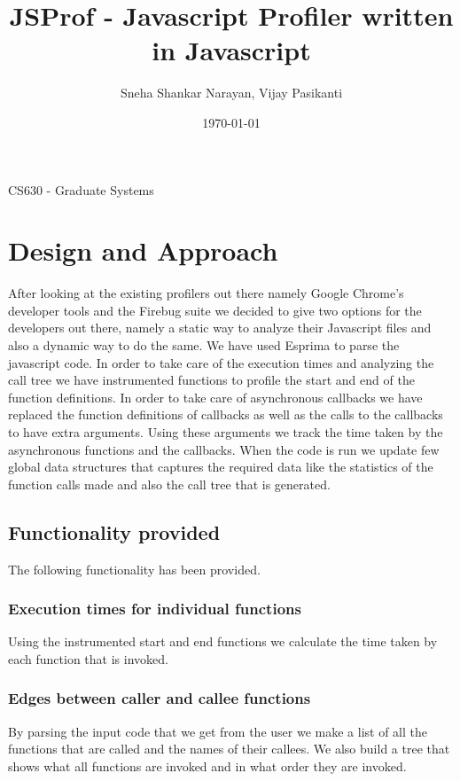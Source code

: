 \documentclass[a4paper, 12pt, notitlepage]{report}
\title{JSProf - Javascript Profiler written in Javascript } %
\author{Sneha Shankar Narayan, Vijay Pasikanti} %
\date{\today} %
\begin{document}
\maketitle
\begin{center}
CS630 - Graduate Systems
\end{center}
\thispagestyle{empty}
\newpage

\tableofcontents 


\chapter{Design and Approach}
%
After looking at the existing profilers out there namely Google Chrome's developer tools and the Firebug suite we decided to give two options for the developers out there, namely a static way to analyze their Javascript files and also a dynamic way to do the same. We have used Esprima to parse the javascript code. In order to take care of the execution times and analyzing the call tree we have instrumented functions to profile the start and end of the function definitions. In order to take care of asynchronous callbacks we have replaced the function definitions of callbacks as well as the calls to the callbacks to have extra arguments. Using these arguments we track the time taken by the asynchronous functions and the callbacks. When the code is run we update few global data structures that captures the required data like the statistics of the function calls made and also the call tree that is generated. 

\section{Functionality provided}
%
The following functionality has been provided.

\subsection{Execution times for individual functions}
%
Using the instrumented start and end functions we calculate the time taken by each function that is invoked.

\subsection{Edges between caller and callee functions}
%
By parsing the input code that we get from the user we make a list of all the functions that are called and the names of their callees. We also build a tree that shows what all functions are invoked and in what order they are invoked.
\end{document}
